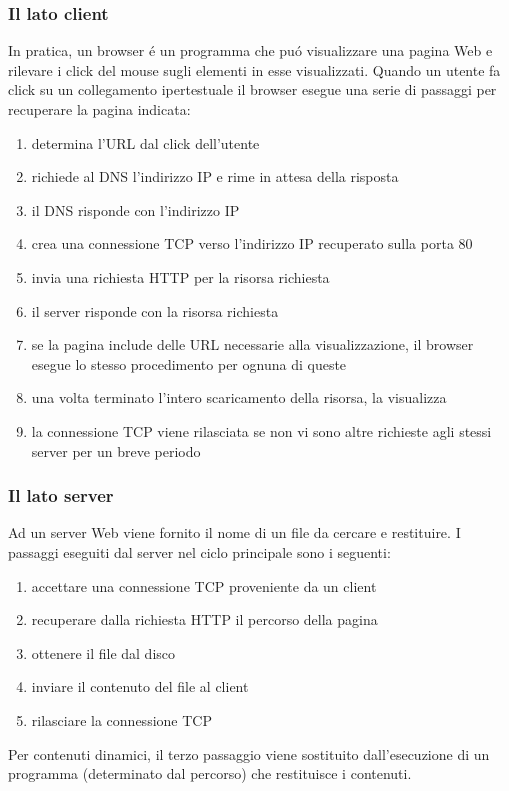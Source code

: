 \documentclass[12pt]{article}
\begin{document}
\subsubsection{Il lato client}\label{web-http-il-lato-client}
In pratica, un browser \'e un programma che pu\'o visualizzare una pagina Web e rilevare i click del mouse sugli elementi in esse 
visualizzati. Quando un utente fa click su un collegamento ipertestuale il browser esegue una serie di passaggi per recuperare la 
pagina indicata:
\begin{enumerate}
	\item determina l'URL dal click dell'utente
	\item richiede al DNS l'indirizzo IP e rime in attesa della risposta
	\item il DNS risponde con l'indirizzo IP
	\item crea una connessione TCP verso l'indirizzo IP recuperato sulla porta 80
	\item invia una richiesta HTTP per la risorsa richiesta
	\item il server risponde con la risorsa richiesta
	\item se la pagina include delle URL necessarie alla visualizzazione, il browser esegue lo stesso procedimento per ognuna di 
	      queste
	\item una volta terminato l'intero scaricamento della risorsa, la visualizza
	\item la connessione TCP viene rilasciata se non vi sono altre richieste agli stessi server per un breve periodo
\end{enumerate}

\subsubsection{Il lato server}\label{web-http-il-lato-server}
Ad un server Web viene fornito il nome di un file da cercare e restituire. I passaggi eseguiti dal server nel ciclo principale 
sono i seguenti:
\begin{enumerate}
	\item accettare una connessione TCP proveniente da un client
	\item recuperare dalla richiesta HTTP il percorso della pagina
	\item ottenere il file dal disco
	\item inviare il contenuto del file al client
	\item rilasciare la connessione TCP
\end{enumerate}
Per contenuti dinamici, il terzo passaggio viene sostituito dall'esecuzione di un programma (determinato dal percorso) che 
restituisce i contenuti.
\end{document}
